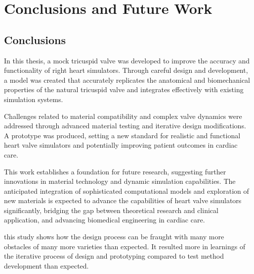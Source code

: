 \chapter{Conclusions and Future Work}\label{ch:conclusion}
\section{Conclusions}
In this thesis, a mock tricuspid valve was developed to improve the accuracy and functionality of right heart simulators. Through careful design and development, a model was created that accurately replicates the anatomical and biomechanical properties of the natural tricuspid valve and integrates effectively with existing simulation systems.

Challenges related to material compatibility and complex valve dynamics were addressed through advanced material testing and iterative design modifications. A prototype was produced, setting a new standard for realistic and functional heart valve simulators and potentially improving patient outcomes in cardiac care.

This work establishes a foundation for future research, suggesting further innovations in material technology and dynamic simulation capabilities. The anticipated integration of sophisticated computational models and exploration of new materials is expected to advance the capabilities of heart valve simulators significantly, bridging the gap between theoretical research and clinical application, and advancing biomedical engineering in cardiac care.

 this study shows how the design process can be fraught with many more obstacles of many more varieties than expected. It resulted more in learnings of the iterative process of design and prototyping compared to test method development than expected.

